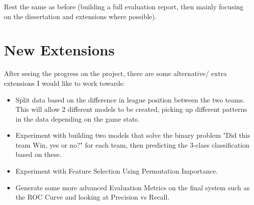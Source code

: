 \documentclass[12pt,a4paper,twoside]{article}
\begin{document}
Rest the same as before (building a full evaluation report, then mainly focusing on the dissertation and extensions where possible).

\section*{New Extensions}

After seeing the progress on the project, there are some alternative/ extra extensions I would like to work towards:

\begin{itemize}
    \item 
    {
    Split data based on the difference in league position between the two teams. This will allow 2 different models to be created, picking up different patterns in the data depending on the game stats.
    }
    \item
    {
    Experiment with building two models that solve the binary problem "Did this team Win, yes or no?" for each team, then predicting the 3-class classification based on these.
    }
    \item
    {
    Experiment with Feature Selection Using Permutation Importance.
    }
    \item
    {
    Generate some more advanced Evaluation Metrics on the final system such as the ROC Curve and looking at Precision vs Recall.
    }
\end{itemize}
\end{document}
